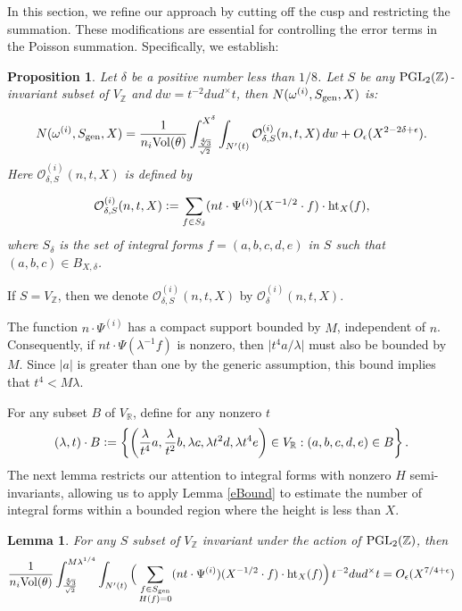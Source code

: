 \documentclass{article}
\def\Z{{\mathbb Z}}
\def\PGL{{\rm PGL}}
\def\gen{{\rm gen}}
\def\Vol{{\rm Vol}}
\def\Z{{\mathbb Z}}
\def \h{{\rm ht}}
\newtheorem{lemma}[theorem]{Lemma}
\newtheorem{proposition}[theorem]{Proposition}
\def \Bods{{\mathcal{O}^{(i)}_{\delta,S}(n,t,X)}}
\def \Bodid{{\mathcal{O}}^{(i)}_{\delta}(n,t,X)}
\def \dw{{t^{-2}dud^\times t  }}
\begin{document}
In this section, we refine our approach by cutting off the cusp and restricting the summation. These modifications are essential for controlling the error terms in the Poisson summation. Specifically, we establish:

\begin{proposition}\label{boundedScounting}
Let $\delta$ be a positive number less than $1/8$. Let $S$ be any $\PGL_2(\Z)$-invariant subset of $V_{\Z}$ and $dw = \dw$, then $N(\omega^{(i)},S_{\gen},X)$ is:


\begin{equation*}
     N(\omega^{(i)},S_{\gen},X) = \frac{1}{n_i \Vol(\theta)} \int_{\frac{\sqrt[4]{3}}{\sqrt{2}}}^{X^{\delta}} \int_{N'(t)}  \Bods\, dw + 
         O_{\epsilon}(X^{2-2\delta+\epsilon}). 
\end{equation*}
Here $\Bods$ is defined by

\begin{equation}
\Bods \vcentcolon= \sum_{\substack{f \in S_{\delta}}} (nt\cdot \Psi^{(i)})(X^{-1/2} \cdot f) \cdot \h_{X}(f),
\end{equation}
where $S_{\delta}$ is the set of integral forms $f = (a,b,c,d,e)$ in $S$ such that $(a,b,c) \in B_{X,\delta}$.
\end{proposition}
If $S = V_{\Z}$, then we denote $\Bods$ by $\Bodid$.

The function $n \cdot \Psi^{(i)}$ has a compact support bounded by $M$, independent of $n$. Consequently, if $nt \cdot \Psi(\lambda^{-1} f)$ is nonzero, then $\big|t^4 a / \lambda \big|$ must also be bounded by $M$. Since $|a|$ is greater than one by the generic assumption, this bound implies that $t^4 < M\lambda$.


For any subset $B$ of $V_{\mathbb{R}}$, define for any nonzero $t$
\begin{equation*}
(\lambda, t) \cdot B \vcentcolon= \left\{ \left( \frac{\lambda}{t^4} a, \frac{\lambda}{t^2}  b, \lambda c, \lambda t^2 d, \lambda t^4 e \right) \in V_{\mathbb{R}} : (a, b, c, d, e) \in B \right\}.
\end{equation*}
The next lemma restricts our attention to integral forms with nonzero $H$ semi-invariants, allowing us to apply Lemma \ref{eBound} to estimate the number of integral forms within a bounded region where the height is less than $X$.

\begin{lemma} \label{H=0}
For any $S$ subset of $V_{\Z}$ invariant under the action of $\PGL_2(\Z)$, then 
\begin{equation*}
 \frac{1}{n_i \Vol(\theta)} \int_{\frac{\sqrt[4]{3}}{\sqrt{2}}}^{M\lambda^{1/4}}\int_{N'(t)} 
      \Big( \sum_{\substack{f \in S_{\gen} \\ H(f) = 0}} (nt \cdot \Psi^{(i)})(X^{-1/2} \cdot f) \cdot \h_{X}(f) \Big)
    \, \dw = O_{\epsilon}(X^{7/4+\epsilon})
\end{equation*}
\end{lemma}
\end{document}
